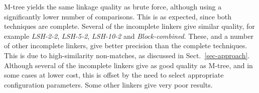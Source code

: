 \documentclass{llncs}
\begin{document}
M-tree yields the same linkage quality as brute force, although using a
significantly lower number of comparisons. This is as expected, since
both techniques are complete. Several of the incomplete linkers give
similar quality, for example \emph{LSH-2-2}, \emph{LSH-5-2},
\emph{LSH-10-2} and \emph{Block-combined}. These, and a number of other
incomplete linkers, give better precision than the complete techniques.
This is due to high-similarity non-matches, as discussed in
Sect.~\ref{sec-approach}. Although several of the incomplete linkers
give as good quality as M-tree, and in some cases at lower cost, this is
offset by the need to select appropriate configuration parameters. Some
other linkers give very poor results.


\end{document}
